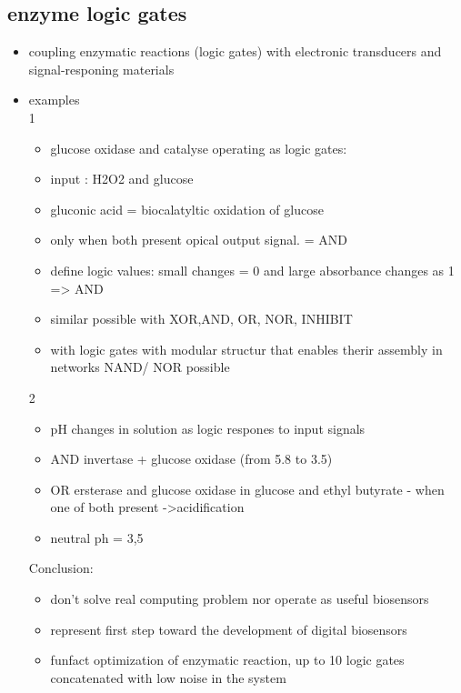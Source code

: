 \documentclass[12pt]{article}
\begin{document}
\subsection{enzyme logic gates}
\begin{itemize}
	\item coupling enzymatic reactions (logic gates) with electronic transducers and signal-responing materials 
	
	\item examples\\
	1
	\begin{itemize}
		\item glucose oxidase and catalyse operating as logic gates: 
		\item input : H2O2 and glucose
		\item gluconic acid = biocalatyltic oxidation of glucose 
		\item only when both present opical output signal. = AND
		\item define logic values: small changes = 0 and large absorbance changes as 1 => AND
		
		\item similar possible with XOR,AND, OR, NOR, INHIBIT
		\item with logic gates with modular structur that enables therir assembly in networks NAND/ NOR possible
		
	\end{itemize}
2\\
\begin{itemize}
	\item pH changes in solution as logic respones to input signals
	\item AND invertase + glucose oxidase (from 5.8 to 3.5)
	\item OR ersterase and glucose oxidase in glucose and ethyl butyrate - when one of both present ->acidification  
	\item neutral ph = 3,5
\end{itemize}
Conclusion: 
\begin{itemize}
	\item don't solve real computing problem  nor operate as useful biosensors 
	\item represent first step toward the development of digital biosensors 
	\item funfact optimization of enzymatic reaction, up to 10 logic gates concatenated with low noise in the system 
\end{itemize}
\end{itemize}
\end{document}
